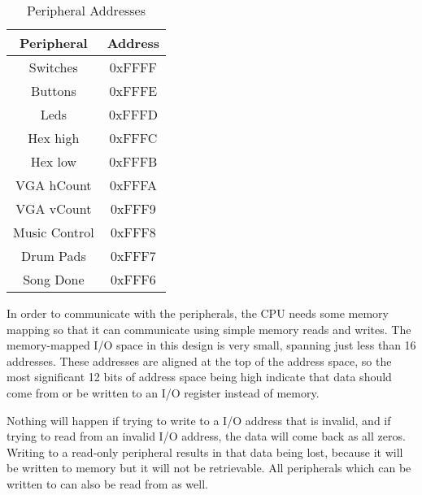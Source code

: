 \documentclass{subfile}
\begin{document}
  \begin{table}[h]
    \caption{Peripheral Addresses} 
    \label{tab:addrs}
    \centering
    \begin{tabular}{|c|c|}
      \hline 
      Peripheral & Address \\ \hline
      \hline
      Switches & 0xFFFF \\ \hline 
      Buttons & 0xFFFE \\ \hline 
      Leds    & 0xFFFD \\ \hline 
      Hex high & 0xFFFC \\ \hline 
      Hex low & 0xFFFB \\ \hline 
      VGA hCount & 0xFFFA \\ \hline 
      VGA vCount & 0xFFF9 \\ \hline 
      Music Control & 0xFFF8 \\ \hline 
      Drum Pads & 0xFFF7 \\ \hline 
      Song Done & 0xFFF6 \\ \hline
    \end{tabular}
  \end{table}

  In order to communicate with the peripherals, the CPU needs some memory mapping so that it 
  can communicate using simple memory reads and writes.
  The memory-mapped I/O space in this design is very small, spanning just less than 16 addresses. 
  These addresses are aligned at the top of the address space, so the most significant 
  12 bits of address space being high indicate that data should come from or be 
  written to an I/O register instead of memory.

  Nothing will happen if trying to write to a I/O address that is invalid, and if trying to 
  read from an invalid I/O address, the data will come back as all zeros.
  Writing to a read-only peripheral results in that data being lost, because it will be 
  written to memory but it will not be retrievable. 
  All peripherals which can be written to can also be read from as well.

  
\end{document}
